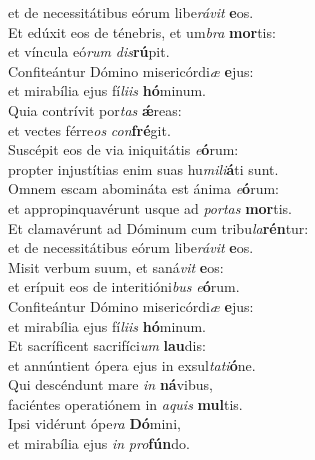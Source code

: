 \oddverse et de necessitátibus eórum libe\textit{rá}\textit{vit} \textbf{e}os.\\
\evenverse Et edúxit eos de ténebris, et um\textit{bra} \textbf{mor}tis:~\*\\
\evenverse et víncula eó\textit{rum} \textit{dis}\textbf{rú}pit.\\
\oddverse Confiteántur Dómino misericórdi\textit{æ} \textbf{e}jus:~\*\\
\oddverse et mirabília ejus fí\textit{li}\textit{is} \textbf{hó}minum.\\
\evenverse Quia contrívit por\textit{tas} \textbf{ǽ}reas:~\*\\
\evenverse et vectes férre\textit{os} \textit{con}\textbf{fré}git.\\
\oddverse Suscépit eos de via iniquitátis \textit{e}\textbf{ó}rum:~\*\\
\oddverse propter injustítias enim suas hu\textit{mi}\textit{li}\textbf{á}ti sunt.\\
\evenverse Omnem escam abomináta est ánima \textit{e}\textbf{ó}rum:~\*\\
\evenverse et appropinquavérunt usque ad \textit{por}\textit{tas} \textbf{mor}tis.\\
\oddverse Et clamavérunt ad Dóminum cum tribu\textit{la}\textbf{rén}tur:~\*\\
\oddverse et de necessitátibus eórum libe\textit{rá}\textit{vit} \textbf{e}os.\\
\evenverse Misit verbum suum, et saná\textit{vit} \textbf{e}os:~\*\\
\evenverse et erípuit eos de interitióni\textit{bus} \textit{e}\textbf{ó}rum.\\
\oddverse Confiteántur Dómino misericórdi\textit{æ} \textbf{e}jus:~\*\\
\oddverse et mirabília ejus fí\textit{li}\textit{is} \textbf{hó}minum.\\
\evenverse Et sacríficent sacrifíci\textit{um} \textbf{lau}dis:~\*\\
\evenverse et annúntient ópera ejus in exsul\textit{ta}\textit{ti}\textbf{ó}ne.\\
\oddverse Qui descéndunt mare \textit{in} \textbf{ná}vibus,~\*\\
\oddverse faciéntes operatiónem in \textit{a}\textit{quis} \textbf{mul}tis.\\
\evenverse Ipsi vidérunt ópe\textit{ra} \textbf{Dó}mini,~\*\\
\evenverse et mirabília ejus \textit{in} \textit{pro}\textbf{fún}do.\\
